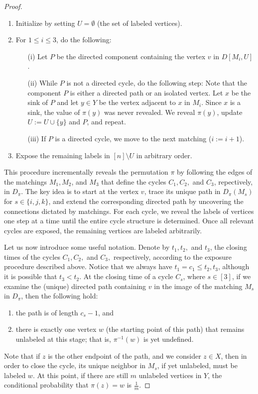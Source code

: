 \documentclass{article}
\begin{document}
\begin{proof}
\begin{enumerate}
    \item Initialize by setting $U=\emptyset$ (the set of labeled vertices).
    \item For $1\leq i \leq 3$, do the following:
    \begin{enumerate}
        \item[(i)] Let $P$ be the directed component containing the vertex $v$ in $D[M_i,U]$.
        \item[(ii)] While $P$ is not a directed cycle, do the following step: Note that the component $P$ is either a directed path or an isolated vertex. Let $x$ be the sink of $P$ and let $y \in Y$ be the vertex adjacent to $x$ in $M_i$. Since $x$ is a sink, the value of $\pi(y)$ was never revealed. We reveal $\pi(y)$, update $U:=U\cup\{y\}$ and $P$, and repeat.
        \item[(iii)] If $P$ is a directed cycle, we move to the next matching ($i:=i+1$).
    \end{enumerate}
    \item Expose the remaining labels in $[n]\setminus U$ in arbitrary order.
\end{enumerate}

This procedure incrementally reveals the permutation $\pi$ by following the edges of the matchings $M_1,M_2$, and $M_3$
  that define the cycles $C_1,C_2,$ and $C_3$, repectively, in $D_{\pi}$. The key idea is to start at the vertex $v$, trace its unique path in $D_{\pi}(M_{s})$ for $s\in \{i,j,k\}$, and extend the corresponding directed path by uncovering the connections dictated by matchings. For each cycle, we reveal the labels of vertices one step at a time until the entire cycle structure is determined. Once all relevant cycles are exposed, the remaining vertices are labeled arbitrarily. 

Let us now introduce some useful notation. Denote by $t_1,t_2,$ and $t_3$, the closing times of the cycles $C_1,C_2,$ and $C_3,$ respectively, according to the exposure procedure described above. Notice that we always have $t_1=c_1\leq t_2,t_3$, although  it is possible that $t_3<t_2$. At the closing time of a cycle $C_s$, where $s\in [3]$, if we examine the (unique) directed path containing $v$ in the image of the matching $M_s$ in $D_{\pi}$, then the following hold: 
\begin{enumerate}
    \item the path is of length $c_s-1$, and
    \item there is exactly one vertex $w$ (the starting point of this path) that remains unlabeled at this stage; that is, $\pi^{-1}(w)$ is yet undefined. 
\end{enumerate}
 Note that if $z$ is the other endpoint of the path, and we consider $z\in X$, then in order to close the cycle, its unique neighbor in $M_s$, if yet unlabeled, must be labeled $w$. At this point, if there are still $m$ unlabeled vertices in $Y$, the conditional probability that $\pi(z)=w$ is $\frac{1}{m}$.


\end{proof}
\end{document}
